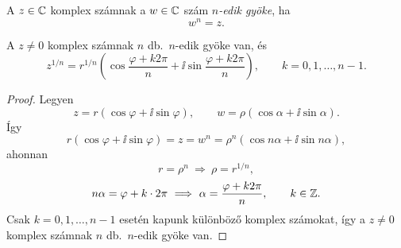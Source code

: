 \documentclass[11pt]{article}
\begin{document}
\begin{defbox}
\begin{definition}
A $z\in\mathbb{C}$ komplex számnak a $w\in\mathbb{C}$ szám \emph{$n$-edik gyöke}, ha
\[
w^{n}=z .
\]
\end{definition}
\end{defbox}

\begin{thmbox}
\begin{theorem}
A $z\neq 0$ komplex számnak $n$ db.\ $n$-edik gyöke van, és
\begin{equation}\label{eq:gyok}
z^{1/n}=r^{1/n}\left(\cos\frac{\varphi+k2\pi}{n}+\ii\sin\frac{\varphi+k2\pi}{n}\right),
\qquad k=0, 1, \dots, n-1 .
\end{equation}
\end{theorem}
\end{thmbox}
\begin{proof}
Legyen
\[
z=r(\cos\varphi+\ii\sin\varphi),\qquad w=\rho(\cos\alpha+\ii\sin\alpha).
\]
Így
\[
r(\cos\varphi+\ii\sin\varphi)=z=w^{n}=\rho^{n}(\cos n\alpha+\ii\sin n\alpha),
\]
ahonnan
\[
r=\rho^{n}\ \Longrightarrow\ \rho=r^{1/n},
\]
\[
n\alpha=\varphi+k\cdot 2\pi\ \Longrightarrow\ \alpha=\frac{\varphi+k2\pi}{n},\qquad k\in\Z .
\]
Csak $k=0, 1, \dots, n-1$ esetén kapunk különböző komplex számokat, így a $z\neq 0$ komplex számnak $n$ db.\ $n$-edik gyöke van.
\end{proof}
\end{document}
